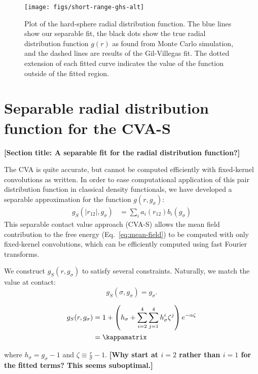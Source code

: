 \documentclass[letterpaper,twocolumn,amsmath,amssymb,pre,aps,10pt]{revtex4-1}
\newcommand{\red}[1]{{\bf \color{red} #1}}
\newcommand{\fixme}[1]{\red{[#1]}}
\begin{document}
\newcommand\kappaO{\kappa_0}
\newcommand\kappaI{\kappa_1}
\newcommand\kappaZ{\kappa_2}



\begin{figure}
  \centering
  \texttt{[image: figs/short-range-ghs-alt]}
  \caption{Plot of the hard-sphere radial distribution function. The
    blue lines show our separable fit, the black dots show the true
    radial distribution function $g(r)$ as found from Monte Carlo
    simulation, and the dashed lines are results of the
    Gil-Villegas\cite{gil1997statistical} fit.  The dotted extension
    of each fitted curve indicates the value of the function outside
    of the fitted region.  }\label{fig:radial-distribution}
\end{figure}

\section{Separable radial distribution function for the CVA-S}
\fixme{Section title:  A separable fit for the radial distribution function?}

The CVA is quite accurate, but cannot be computed efficiently
with fixed-kernel convolutions as written.  In order to ease
computational application of this pair distribution function in
classical density functionals, we have developed a separable
approximation for the function $g(r,g_\sigma)$:
\begin{align}
  g_S(|r_{12}|, g_\sigma) &= \sum_{i} a_i(r_{12}) b_i(g_\sigma)
\end{align}
This separable contact value approach (CVA-S) allows the mean
field contribution to the free energy (Eq.~\ref{eq:mean-field}) to be
computed with only fixed-kernel convolutions, which can be
efficiently computed using fast Fourier transforms.

We construct $g_S(r, g_\sigma)$ to satisfy several constraints.
Naturally, we match the value at contact:
\begin{equation}
  g_S(\sigma, g_\sigma) = g_\sigma.
\end{equation}

\begin{widetext}
\begin{align}
  g_S(r,g_\sigma) &=
  1 + \left(h_\sigma + \sum_{i=2}^{4} \sum_{j=1}^{4} h_\sigma^i
  \zeta^j\right)e^{-\alpha \zeta}
  \\
  &= \kappamatrix
\end{align}
\end{widetext}
where $h_\sigma = g_\sigma - 1$ and $\zeta \equiv
\frac{r}{\sigma}-1$.  \fixme{Why start at $i=2$ rather than $i=1$ for
  the fitted terms? This seems suboptimal.}
\end{document}
